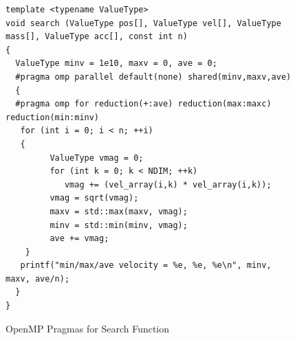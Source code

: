 \documentclass[12pt]{article} %
\begin{document}
\begin{figure}[]
\caption{OpenMP Pragmas for Search Function}\label{fig:benchmark01}
\begin{lstlisting}
template <typename ValueType>
void search (ValueType pos[], ValueType vel[], ValueType mass[], ValueType acc[], const int n)
{
  ValueType minv = 1e10, maxv = 0, ave = 0;
  #pragma omp parallel default(none) shared(minv,maxv,ave)
  {
  #pragma omp for reduction(+:ave) reduction(max:maxc) reduction(min:minv)       
   for (int i = 0; i < n; ++i)
   {
         ValueType vmag = 0;
         for (int k = 0; k < NDIM; ++k)
         	vmag += (vel_array(i,k) * vel_array(i,k));
         vmag = sqrt(vmag);
         maxv = std::max(maxv, vmag);
         minv = std::min(minv, vmag);
         ave += vmag;
    }
   printf("min/max/ave velocity = %e, %e, %e\n", minv, maxv, ave/n);
  }
}
\end{lstlisting}
\end{figure}

\begin{table}[]
\centering
\caption{Stampede2 - Compute Node (knl) - System Information}
\end{table}
\end{document}
